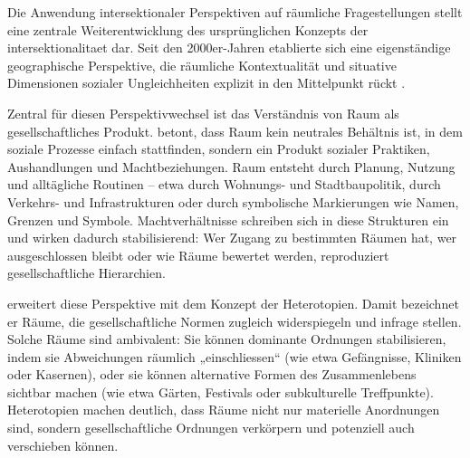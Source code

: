 \vspace{2em}

Die Anwendung intersektionaler Perspektiven auf räumliche Fragestellungen stellt eine zentrale Weiterentwicklung des ursprünglichen Konzepts der \gls{intersektionalitaet} dar. Seit den 2000er-Jahren etablierte sich eine eigenständige geographische Perspektive, die räumliche Kontextualität und situative Dimensionen sozialer Ungleichheiten explizit in den Mittelpunkt rückt \parencite{valentineTheorizingResearchingIntersectionality2007,rodo-de-zarateIntersectionalityFeministGeographies2018}.

Zentral für diesen Perspektivwechsel ist das Verständnis von Raum als gesellschaftliches Produkt. \textcite{lefebvreProductionLespace1974} betont, dass Raum kein neutrales Behältnis ist, in dem soziale Prozesse einfach stattfinden, sondern ein Produkt sozialer Praktiken, Aushandlungen und Machtbeziehungen. Raum entsteht durch Planung, Nutzung und alltägliche Routinen -- etwa durch Wohnungs- und Stadtbaupolitik, durch Verkehrs- und Infrastrukturen oder durch symbolische Markierungen wie Namen, Grenzen und Symbole. Machtverhältnisse schreiben sich in diese Strukturen ein und wirken dadurch stabilisierend: Wer Zugang zu bestimmten Räumen hat, wer ausgeschlossen bleibt oder wie Räume bewertet werden, reproduziert gesellschaftliche Hierarchien.

\textcite{foucaultEspacesAutres2004} erweitert diese Perspektive mit dem Konzept der Heterotopien. Damit bezeichnet er Räume, die gesellschaftliche Normen zugleich widerspiegeln und infrage stellen. Solche Räume sind ambivalent: Sie können dominante Ordnungen stabilisieren, indem sie Abweichungen räumlich „einschliessen“ (wie etwa Gefängnisse, Kliniken oder Kasernen), oder sie können alternative Formen des Zusammenlebens sichtbar machen (wie etwa Gärten, Festivals oder subkulturelle Treffpunkte). Heterotopien machen deutlich, dass Räume nicht nur materielle Anordnungen sind, sondern gesellschaftliche Ordnungen verkörpern und potenziell auch verschieben können.

